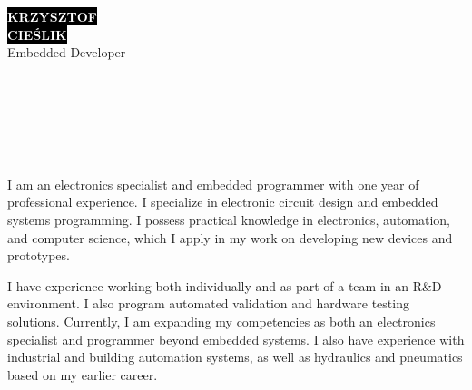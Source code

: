 \documentclass[9pt]{developercv}
\begin{document}

\begin{minipage}[t]{0.49\textwidth}
    \vspace{-\baselineskip}
    \colorbox{black}{{\HUGE\textcolor{white}{\textbf{KRZYSZTOF}}}}\\[0.5ex]
    \colorbox{black}{{\HUGE\textcolor{white}{\textbf{CIEŚLIK}}}}\\[1ex]
    {\huge Embedded Developer}\\
\end{minipage}%
\hfill
\begin{minipage}[t]{0.49\textwidth}
    \vspace{-\baselineskip}
    \\[1ex]
    \\[1ex]
    \\[1ex]
    \\[1ex]
    \\[1ex]
\end{minipage}


\noindent
I am an electronics specialist and embedded programmer with one year of professional experience.
I specialize in electronic circuit design and embedded systems programming.
I possess practical knowledge in electronics, automation, and computer science, which I apply
in my work on developing new devices and prototypes.

\vspace{0.5ex}
\noindent
I have experience working both individually and as part of a team in an R\&D environment.
I also program automated validation and hardware testing solutions.
Currently, I am expanding my competencies as both an electronics specialist and programmer
beyond embedded systems. I also have experience with industrial and building automation systems,
as well as hydraulics and pneumatics based on my earlier career.
\end{document}
